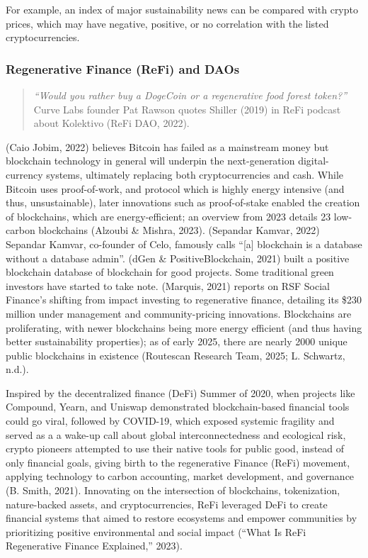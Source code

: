\documentclass[
  12pt,
  letterpaper,
  DIV=11,
  numbers=noendperiod]{scrartcl}
\begin{document}
For example, an index of major sustainability news can be compared with
crypto prices, which may have negative, positive, or no correlation with
the listed cryptocurrencies.

\subsubsection{Regenerative Finance (ReFi) and
DAOs}\label{regenerative-finance-refi-and-daos}

\begin{quote}
\emph{``Would you rather buy a DogeCoin or a regenerative food forest
token?''} Curve Labs founder Pat Rawson quotes Shiller (2019) in ReFi
podcast about Kolektivo (ReFi DAO, 2022).
\end{quote}

(Caio Jobim, 2022) believes Bitcoin has failed as a mainstream money but
blockchain technology in general will underpin the next-generation
digital-currency systems, ultimately replacing both cryptocurrencies and
cash. While Bitcoin uses proof-of-work, and protocol which is highly
energy intensive (and thus, unsustainable), later innovations such as
proof-of-stake enabled the creation of blockchains, which are
energy-efficient; an overview from 2023 details 23 low-carbon
blockchains (Alzoubi \& Mishra, 2023). (Sepandar Kamvar, 2022) Sepandar
Kamvar, co-founder of Celo, famously calls ``{[}a{]} blockchain is a
database without a database admin''. (dGen \& PositiveBlockchain, 2021)
built a positive blockchain database of blockchain for good projects.
Some traditional green investors have started to take note. (Marquis,
2021) reports on RSF Social Finance's shifting from impact investing to
regenerative finance, detailing its \$230 million under management and
community-pricing innovations. Blockchains are proliferating, with newer
blockchains being more energy efficient (and thus having better
sustainability properties); as of early 2025, there are nearly 2000
unique public blockchains in existence (Routescan Research Team, 2025;
L. Schwartz, n.d.).

Inspired by the decentralized finance (DeFi) Summer of 2020, when
projects like Compound, Yearn, and Uniswap demonstrated blockchain-based
financial tools could go viral, followed by COVID-19, which exposed
systemic fragility and served as a a wake-up call about global
interconnectedness and ecological risk, crypto pioneers attempted to use
their native tools for public good, instead of only financial goals,
giving birth to the regenerative Finance (ReFi) movement, applying
technology to carbon accounting, market development, and governance (B.
Smith, 2021). Innovating on the intersection of blockchains,
tokenization, nature-backed assets, and cryptocurrencies, ReFi leveraged
DeFi to create financial systems that aimed to restore ecosystems and
empower communities by prioritizing positive environmental and social
impact ({``What Is {ReFi} {\textbar} {Regenerative Finance}
Explained,''} 2023).
\end{document}
